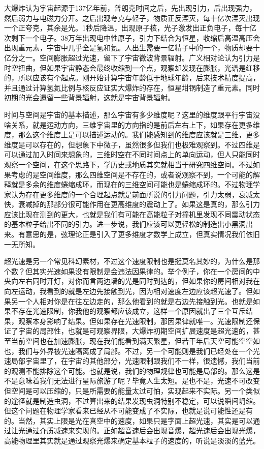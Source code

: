 \documentclass[
]{book}
\begin{document}
大爆炸认为宇宙起源于137亿年前，普朗克时间之后，先出现引力，后出现强力，然后弱力与电磁力分开。之后出现夸克与轻子，物质正反湮灭，每十亿次湮灭出现一个正夸克，其余是光。1秒后降温，出现原子核，光子激发出正负电子，每十亿次剩下一个电子。38万年出现电中性原子，引力下结合为恒星，收缩后高温高压会出现重元素，宇宙中几乎全是氢和氦。人出生需要一亿精子中的一个，物质却要十亿分之一。空间膨胀超过光速，留下了宇宙微波背景辐射。广义相对论认为引力是时空扭曲，但如果宇宙静态会最终收缩到一个点，观察却发现在膨胀，光谱是红移的，所以应该有个起点。刚开始计算宇宙年龄低于地球年龄，后来技术精度提高，并且通过计算氢氦比例与核反应证实大爆炸的存在，恒星坩锅制造了重元素。同时初期的光会遗留一些背景辐射，这就是宇宙背景辐射。

时间与空间是宇宙的基本描述，那么宇宙有多少维度呢？这里的维度跟平行宇宙没啥关系，就是运动方向，三维宇宙里的方向指的是前后左右上下，如果存在更多维度，那么这个维度上是可以描述运动的。我们能感知到的维度应该就是三维，更多维度是可以存在的，但想象下中微子，虽然很多但我们也极难观察到。不过四维是可以通过加入时间来想象的，三维时空在不同时间点上的单向运动，但人只能同时观察一个空间，在这个思路下，学历史或地质其实就相当于研究四维空间。不过如果考虑的是空间维度，那么四维空间是不存在的，或者说观察不到，一个可能的解释就是多余的维度蜷缩成环，而现在的三维空间可能也是蜷缩成环的。不过物理学家认为存在更多维度的一个合理起点就是前面所说的引力问题，引力太弱，衰减太快，衰减掉的那部分很可能作用在更高维度的震动上了。如果这是真的，那么引力应该比现在测到的更大，也就是我们有可能在高能粒子对撞机里发现不同震动状态的基本粒子给出不同的引力。进一步说，我们应该可以更轻松的制造出小黑洞出来。有意思的是，弦理论正是引入了更多维度才数学上成立，但真实情况我们依旧一无所知。

超光速是另一个常见科幻素材，不过这个速度限制也是挺莫名其妙的，为什么是那个数？但其实光速如果没有限制是会违法因果律的。举个例子，你在一个房间的中央向左右同时开灯，对你而言两边墙的光是同时到达的，但如果你的房间相对我在向左运动，我看到的就是左边先接触到光，因为相对速度左边应该超光速了。但如果另一个人相对你是在往左边走的，那么他看到的就是右边先接触到光。也就是如果不存在光速限制，你我他的观察都应该成立，这样一个原因就出了三个互斥结果，观察本身影响了结果。但如果存在光速限制，那因果律就唯一。光速限制还保证了宇宙的局部性，也就是可观察界限，大爆炸初期空间扩展速度是超光速的，甚至当前空间也在加速膨胀，现在我们能看到满天繁星，但若干年后天空可能空空如也，我们与外界被光速隔离成了局部。不过，另一个可能则是我们已经处在一个光速局部宇宙里了，在宇宙的其他部分，光速限制跟我们不一样，很遗憾，我们当前的观测不能排除这个可能。也就是说，我们的物理规律也可能是局部的。那么这是不是意味着我们无法进行星际旅游了呢？毕竟人生太短。是也不是，光速不可改变但空间是可以压缩的，只是所需要的能量太过可怕，实现起来不实际。另一个类似的途径就是制造虫洞，不过算出来的结果发现虫洞特别不稳定，可以说瞬间坍缩。但这个问题在物理学家看来已经从不可能变成了不实际，也就是说可能性还是有的。当然，其实上限是光在真空中的速度，如果只是字面上超光速，其实是可以通过让光通过介质减速来实现的。正如超音速后会出现音爆，超光速后会出现光爆，高能物理里其实就是通过观察光爆来确定基本粒子的速度的，听说是淡淡的蓝光。
\end{document}
